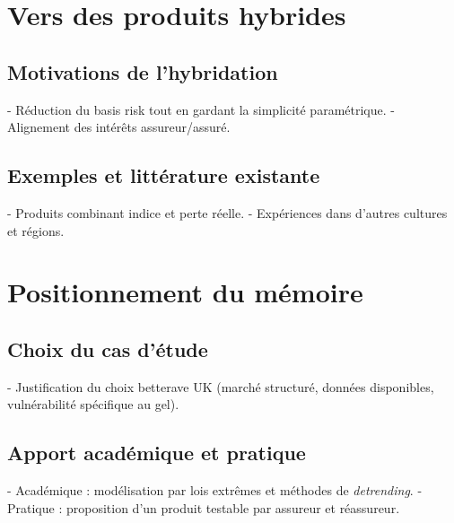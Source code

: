 \documentclass[11pt,a4paper,openright,twoside]{report}
\begin{document}
\section{Vers des produits hybrides}
\subsection{Motivations de l’hybridation}
- Réduction du basis risk tout en gardant la simplicité paramétrique.  
- Alignement des intérêts assureur/assuré.  

\subsection{Exemples et littérature existante}
- Produits combinant indice et perte réelle.  
- Expériences dans d’autres cultures et régions.  

\section{Positionnement du mémoire}
\subsection{Choix du cas d’étude}
- Justification du choix betterave UK (marché structuré, données disponibles, vulnérabilité spécifique au gel).  

\subsection{Apport académique et pratique}
- Académique : modélisation par lois extrêmes et méthodes de \textit{detrending}.  
- Pratique : proposition d’un produit testable par assureur et réassureur.  


\clearpage
{}


\end{document}
